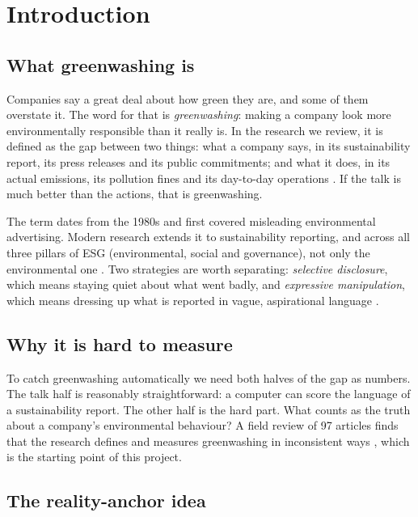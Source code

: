 \documentclass[12pt,a4paper]{article}
\begin{document}
\tableofcontents
\clearpage
\listoftables
\clearpage
{}
\section{Introduction}

\subsection{What greenwashing is}

Companies say a great deal about how green they are, and some of them overstate it. The word for
that is \emph{greenwashing}: making a company look more environmentally responsible than it
really is. In the research we review, it is defined as the gap between two things: what a company
says, in its sustainability report, its press releases and its public commitments; and what it
does, in its actual emissions, its pollution fines and its day-to-day operations
\citep{dorfleitner2024}. If the talk is much better than the actions, that is greenwashing.

The term dates from the 1980s and first covered misleading environmental advertising. Modern
research extends it to sustainability reporting, and across all three pillars of ESG
(environmental, social and governance), not only the environmental one \citep{davidescu2026}. Two
strategies are worth separating: \emph{selective disclosure}, which means staying quiet about
what went badly, and \emph{expressive manipulation}, which means dressing up what is reported in
vague, aspirational language \citep{wang2025}.

\subsection{Why it is hard to measure}

To catch greenwashing automatically we need both halves of the gap as numbers. The talk half is
reasonably straightforward: a computer can score the language of a sustainability report. The
other half is the hard part. What counts as the truth about a company's environmental behaviour?
A field review of 97 articles finds that the research defines and measures greenwashing in
inconsistent ways \citep{forliano2025}, which is the starting point of this project.

\subsection{The reality-anchor idea}
\end{document}
